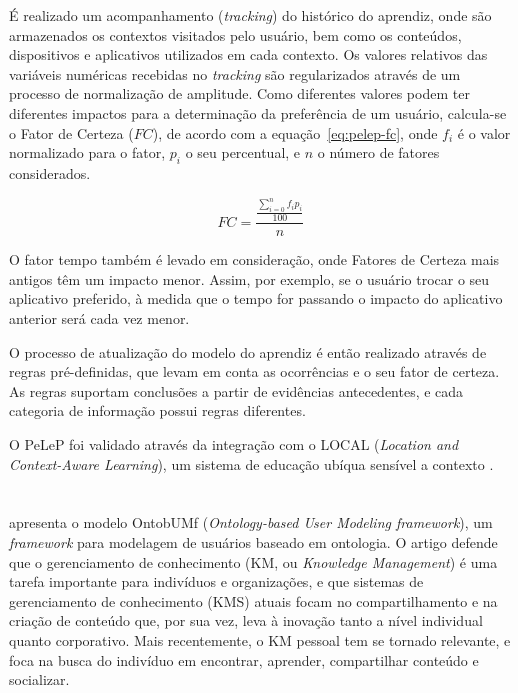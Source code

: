 É realizado um acompanhamento ({\em tracking}) do histórico do aprendiz, onde são armazenados os contextos visitados pelo usuário, bem como os conteúdos, dispositivos e aplicativos utilizados em cada contexto. Os valores relativos das variáveis numéricas recebidas no {\em tracking} são regularizados através de um processo de normalização de amplitude. Como diferentes valores podem ter diferentes impactos para a determinação da preferência de um usuário, calcula-se o Fator de Certeza ($FC$), de acordo com a equação~\ref{eq:pelep-fc}, onde $f_i$ é o valor normalizado para o fator, $p_i$ o seu percentual, e $n$ o número de fatores considerados.

\begin{equation}
  FC = \frac{\frac{\displaystyle\sum_{i=0}^n f_i p_i}{100}}{n}
  \label{eq:pelep-fc}
\end{equation}

O fator tempo também é levado em consideração, onde Fatores de Certeza mais antigos têm um impacto menor. Assim, por exemplo, se o usuário trocar o seu aplicativo preferido, à medida que o tempo for passando o impacto do aplicativo anterior será cada vez menor.

O processo de atualização do modelo do aprendiz é então realizado através de regras pré-definidas, que levam em conta as ocorrências e o seu fator de certeza. As regras suportam conclusões a partir de evidências antecedentes, e cada categoria de informação possui regras diferentes.

O PeLeP foi validado através da integração com o LOCAL ({\em Location and Context-Aware Learning}), um sistema de educação ubíqua sensível a contexto \cite{barbosa11}.


\section{}

 apresenta o modelo OntobUMf ({\it Ontology-based User Modeling framework}), um {\it framework} para modelagem de usuários baseado em ontologia. O artigo defende que o gerenciamento de conhecimento (KM, ou {\it Knowledge Management}) é uma tarefa importante para indivíduos e organizações, e que sistemas de gerenciamento de conhecimento (KMS) atuais focam no compartilhamento e na criação de conteúdo que, por sua vez, leva à inovação tanto a nível individual quanto corporativo. Mais recentemente, o KM pessoal tem se tornado relevante, e foca na busca do indivíduo em encontrar, aprender, compartilhar conteúdo e socializar.

